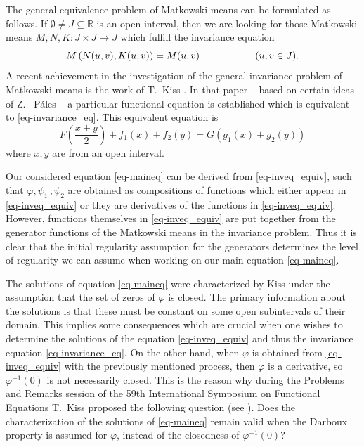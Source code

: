 \documentclass[12pt]{amsart}
\theoremstyle{remark}
\theoremstyle{definition}
\newcommand{\RR}{\mathbb{R}}
\newcommand{\map}{\longrightarrow}
\begin{document}
The general equivalence problem of Matkowski means 
can be formulated as follows. 
If $ \emptyset \neq J \subseteq \RR $ is an open interval, 
then we are looking for those Matkowski means 
$ M, N, K : J \times J \map J $ 
which fulfill the invariance equation 
\begin{equation}\label{eq-invariance_eq}
M \left( N(u,v) , K(u,v) \right) = M(u,v) 
\hspace{20mm} 
(u,v \in J). 
\end{equation} 
A recent achievement in the investigation of 
the general invariance problem of Matkowski means is 
the work of T.~Kiss \cite{Kis22}. In that paper 
-- based on certain ideas of Z.~ Páles -- 
a particular functional equation 
is established which is equivalent to 
\eqref{eq-invariance_eq}. 
This equivalent equation is 
\begin{equation}\label{eq-inveq_equiv}
F \left( \frac{x+y}{2} \right) + f_1(x) + f_2(y) = 
G \left( g_1(x) + g_2(y) \right) 
\end{equation}
where $ x,y $ are from an open interval. 

Our considered equation \eqref{eq-maineq} can be 
derived from \eqref{eq-inveq_equiv}, such that 
$ \varphi , \psi_1 \,, \psi_2 $ are 
obtained as compositions of functions 
which either appear in \eqref{eq-inveq_equiv} 
or they are derivatives of the functions in \eqref{eq-inveq_equiv}. 
However, functions themselves in \eqref{eq-inveq_equiv} 
are put together from the generator functions of 
the Matkowski means in the invariance problem. 
Thus it is clear that the initial regularity assumption for 
the generators determines the level of regularity 
we can assume when working on our main equation 
\eqref{eq-maineq}. 

The solutions of equation \eqref{eq-maineq} 
were characterized by Kiss \cite{Kis24} under the 
assumption that the set of zeros of 
$ \varphi $ is closed. 
The primary information about the solutions is that 
these must be constant on some open subintervals of 
their domain. This implies some consequences 
which are crucial when one wishes to determine 
the solutions of the equation \eqref{eq-inveq_equiv} 
and thus the invariance equation \eqref{eq-invariance_eq}. 
On the other hand, when 
$ \varphi $ is obtained from \eqref{eq-inveq_equiv} 
with the previously mentioned process, 
then $ \varphi $ is a derivative, 
so $ \varphi^{-1}(0) $ is not necessarily closed.
This is the reason why 
during the Problems and Remarks session of the 
59th International Symposium on Functional Equations 
T.~Kiss proposed 
the following question (see \cite{59ISFE}). 
Does the characterization \cite[Theorem 6]{Kis24} 
of the solutions of \eqref{eq-maineq} remain valid when the 
Darboux property is assumed for $ \varphi $, 
instead of the closedness of $ \varphi^{-1} (0) $? 
\end{document}
